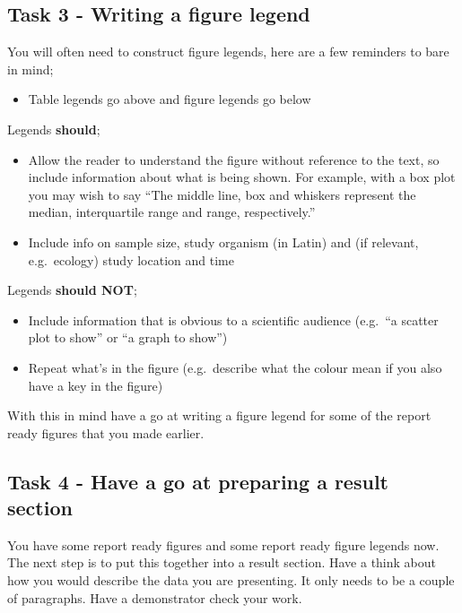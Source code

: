\documentclass[
]{book}
\providecommand{\tightlist}{%
  \setlength{\itemsep}{0pt}\setlength{\parskip}{0pt}}
\begin{document}
\subsection{Task 3 - Writing a figure legend}\label{legend2}

You will often need to construct figure legends, here are a few reminders to bare in mind;

\begin{itemize}
\tightlist
\item
  Table legends go above and figure legends go below
\end{itemize}

Legends \textbf{should};

\begin{itemize}
\tightlist
\item
  Allow the reader to understand the figure without reference to the text, so include information about what is being shown. For example, with a box plot you may wish to say ``The middle line, box and whiskers represent the median, interquartile range and range, respectively.''
\item
  Include info on sample size, study organism (in Latin) and (if relevant, e.g.~ecology) study location and time
\end{itemize}

Legends \textbf{should NOT};

\begin{itemize}
\tightlist
\item
  Include information that is obvious to a scientific audience (e.g.~``a scatter plot to show'' or ``a graph to show'')
\item
  Repeat what's in the figure (e.g.~describe what the colour mean if you also have a key in the figure)
\end{itemize}

With this in mind have a go at writing a figure legend for some of the report ready figures that you made earlier.

\subsection{Task 4 - Have a go at preparing a result section}\label{task-4---have-a-go-at-preparing-a-result-section}

You have some report ready figures and some report ready figure legends now. The next step is to put this together into a result section. Have a think about how you would describe the data you are presenting. It only needs to be a couple of paragraphs. Have a demonstrator check your work.
\end{document}
